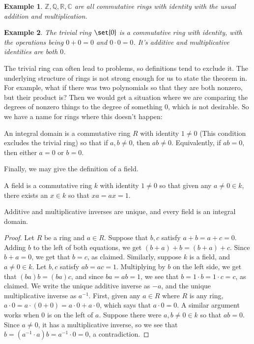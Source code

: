 \documentclass[12pt]{article}
\newenvironment{theorem}{\begin{mytheorem}}{\end{mytheorem}}
\theoremstyle{definitionstyle}
\newenvironment{definition}{\begin{mydef}}{\end{mydef}}
\newtheorem*{example}{Example}
\def\mbb#1{\mathbb{#1}}
\def \C{\mbb{C}}
\def \R{\mbb{R}}
\def\bQ{\mbb{Q}}
\def\bZ{\mbb{Z}}
\begin{document}
\begin{example}
	$\bZ, \bQ, \R, \C$ are all commutative rings with identity with the usual addition and multiplication.
\end{example}
\begin{example}
	The trivial ring $\set{0}$ is a commutative ring with identity, with the operations being $0 + 0 = 0$ and $0 \cdot 0 = 0$. It's additive and multiplicative identities are both $0$.
\end{example}
The trivial ring can often lead to problems, so definitions tend to exclude it. The underlying structure of rings is not strong enough for us to state the theorem in. For example, what if there was two polynomials so that they are both nonzero, but their product is? Then we would get a situation where we are comparing the degrees of nonzero things to the degree of something $0$, which is not desirable. So we have a name for rings where this doesn't happen:
\begin{definition}
	An integral domain is a commutative ring $R$ with identity $1 \neq 0$ (This condition excludes the trivial ring) so that if $a, b \neq 0$, then $ab \neq 0$. Equivalently, if $ab = 0$, then either $a = 0$ or $b = 0$.
\end{definition}
Finally, we may give the definition of a field.
\begin{definition}
	A field is a commutative ring $k$ with identity $1 \neq 0$ so that given any $a \neq 0 \in k$, there exists an $x \in k$ so that $xa = ax = 1$.
\end{definition}
\begin{theorem}
	Additive and multiplicative inverses are unique, and every field is an integral domain.
\end{theorem}
\begin{proof}
	Let $R$ be a ring and $a \in R$. Suppose that $b, c$ satisfy $a + b = a + c = 0$. Adding $b$ to the left of both equations, we get $(b+a)+b = (b+a)+c$. Since $b+a = 0$, we get that $b = c$, as claimed. Similarly, suppose $k$ is a field, and $a \neq 0 \in k$. Let $b, c$ satisfy $ab = ac = 1$. Multiplying by $b$ on the left side, we get that $(ba)b = (ba)c$, and since $ba = ab = 1$, we see that $b = 1 \cdot b = 1 \cdot c = c$, as claimed. We write the unique additive inverse as $-a$, and the unique multiplicative inverse as $a^{-1}$. First, given any $a \in R$ where $R$ is any ring, $a \cdot 0 = a \cdot (0 + 0) = a \cdot 0 + a \cdot 0$, which says that $a \cdot 0 = 0$. A similar argument works when $0$ is on the left of $a$. Suppose there were $a, b \neq 0 \in k$ so that $ab = 0$. Since $a \neq 0$, it has a multiplicative inverse, so we see that $b=(a^{-1} \cdot a)b = a^{-1} \cdot 0 = 0$, a contradiction.
\end{proof}
\end{document}
